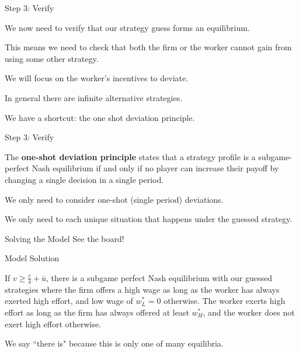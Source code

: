 \documentclass[aspectratio=169,usenames,dvipsnames]{beamer}
\newenvironment{wideitemize}{\itemize\addtolength{\itemsep}{10pt}}{\enditemize}
\begin{document}
\begin{frame}{Step 3: Verify}
\begin{wideitemize}
    \item We now need to verify that our strategy guess forms an equilibrium.
    \item This means we need to check that both the firm or the worker cannot gain from using some other strategy.
    \item We will focus on the worker's incentives to deviate.
    \item In general there are infinite alternative strategies.
    \item We have a shortcut: the one shot deviation principle.
\end{wideitemize}
    
\end{frame}
\begin{frame}{Step 3: Verify}
\begin{definition}
    The \textbf{one-shot deviation principle} states that a strategy profile is a subgame-perfect Nash equilibrium if and only if no player can increase their payoff by changing a single decision in a single period. 
    \end{definition}

    \begin{wideitemize}
        \item We only need to consider one-shot (single period) deviations.
        \item We only need to each unique situation that happens under the guessed strategy.
    \end{wideitemize}
    
\end{frame}


\begin{frame}{Solving the Model}
\centering
    \huge See the board!

\end{frame}

\begin{frame}{Model Solution}

\begin{theorem}
    If $  v \geq  \frac{c}{\delta}+  \bar u$, there is a subgame perfect Nash equilibrium with our guessed strategies where the firm offers a high wage as long as the worker has always exerted high effort, and low wage of $w_L^*=0$ otherwise. The worker exerts high effort as long as the firm has always offered at least $w_H^*$, and the worker does not exert high effort otherwise.
\end{theorem}
    \begin{wideitemize}
        \item We say ``there is" because this is only one of many equilibria.
    \end{wideitemize}
\end{frame}
\end{document}
